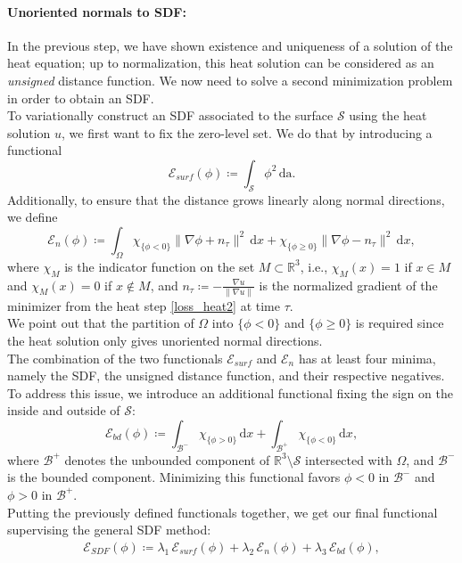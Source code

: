\documentclass[12pt,openany]{book}
\newcommand{\R}{\mathbb{R}}
\def\S{\mathcal{S}}
\theoremstyle{plainnormal}
\theoremstyle{remark}
\begin{document}
\paragraph{Unoriented normals to SDF:}
In the previous step, we have shown existence and uniqueness of a solution of the heat equation; up to normalization, this heat solution can be considered as an \emph{unsigned} distance function. We now need to solve a second minimization problem in order to obtain an SDF.\\
To variationally construct an SDF associated to the surface $\mathcal{S}$ using the heat solution $u$, we first want to fix the zero-level set. We do that by introducing a functional $$\mathcal{E}_{surf}(\phi) \coloneqq \int_\mathcal{S} \phi^2 \,\mathrm{da}.$$
Additionally, to ensure that the distance grows linearly along normal directions, we define $$\mathcal{E}_{n}(\phi) \coloneqq \int_\Omega \chi_{\{\phi < 0\}} \|\nabla \phi + n_\tau\|^2 \,\mathrm{d}x + \chi_{\{\phi \geq 0\}} \|\nabla \phi - n_\tau\|^2 \,\mathrm{d}x,$$
where $\chi_M$ is the indicator function on the set $M\subset \R^3$, i.e., $\chi_M(x) = 1$ if $x\in M$ and $\chi_M(x) = 0$ if $x\notin M$, and  $n_\tau \coloneqq - \frac{\nabla u}{\|\nabla u\|}$ is the normalized gradient of the minimizer from the heat step \eqref{loss_heat2} at time $\tau$.\\ 
We point out that the partition of $\Omega$ into $\{\phi < 0\}$ and $\{\phi \geq 0\}$ is required since the heat solution only gives unoriented normal directions.\\
The combination of the two functionals $\mathcal E_{surf}$ and $\mathcal E_{n}$ has at least four minima, namely the SDF, the unsigned distance function, and their respective negatives. To address this issue, we introduce an additional functional fixing the sign on the inside and outside of $\S$: 
$$\mathcal{E}_{bd}(\phi) \coloneqq \int_{\mathcal{B^-}} \chi_{\{\phi > 0\}} \,\mathrm{d}x + \int_{\mathcal{B^+}}\chi_{\{\phi < 0\}} \,\mathrm{d}x,$$
where $\mathcal{B}^+$ denotes the unbounded component of $\R^3\setminus\S$ intersected with $\Omega$, and $\mathcal{B}^-$ is the bounded component. Minimizing this functional favors $\phi < 0$ in $\mathcal B^-$ and $\phi> 0$ in $\mathcal B^+$.\\
Putting the previously defined functionals together, we get our final functional supervising the general SDF method:
\begin{align}\label{E_SDF}
    \mathcal{E}_{SDF}(\phi) \coloneqq \lambda_1\,\mathcal{E}_{surf} (\phi)+ \lambda_2\,\mathcal{E}_{n}(\phi) + \lambda_3\,\mathcal{E}_{bd}(\phi),
\end{align}
\end{document}
